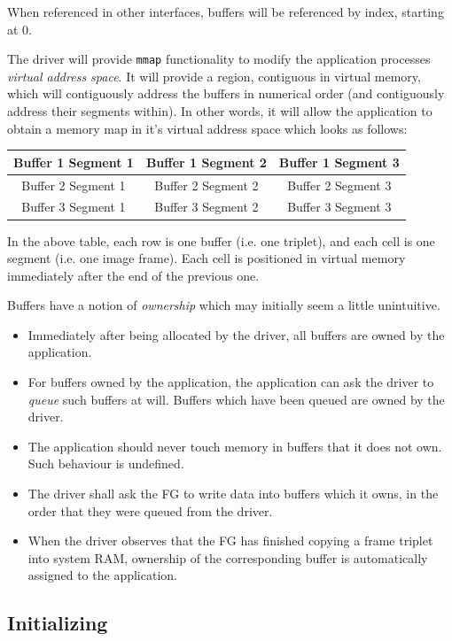 \documentclass[12pt]{article}
\begin{document}
When referenced in other interfaces, buffers will be referenced by index, starting at 0.

The driver will provide \texttt{mmap} functionality to modify the application processes \textit{virtual address space}. It will provide a region, contiguous in virtual memory, which will contiguously address the buffers in numerical order (and contiguously address their segments within). In other words, it will allow the application to obtain a memory map in it's virtual address space which looks as follows:

\begin{tabular}{|c|c|c|}\hline
Buffer 1 Segment 1 & Buffer 1 Segment 2 & Buffer 1 Segment 3 \\ \hline
Buffer 2 Segment 1 & Buffer 2 Segment 2 & Buffer 2 Segment 3 \\ \hline
Buffer 3 Segment 1 & Buffer 3 Segment 2 & Buffer 3 Segment 3 \\ \hline
\end{tabular}

In the above table, each row is one buffer (i.e. one triplet), and each cell is one segment (i.e. one image frame). Each cell is positioned in virtual memory immediately after the end of the previous one.

Buffers have a notion of \textit{ownership} which may initially seem a little unintuitive.
\begin{itemize}
\item Immediately after being allocated by the driver, all buffers are owned by the application.
\item For buffers owned by the application, the application can ask the driver to \textit{queue} such buffers at will. Buffers which have been queued are owned by the driver.
\item The application should never touch memory in buffers that it does not own. Such behaviour is undefined.
\item The driver shall ask the FG to write data into buffers which it owns, in the order that they were queued from the driver.
\item When the driver observes that the FG has finished copying a frame triplet into system RAM, ownership of the corresponding buffer is automatically assigned to the application.
\end{itemize}

\subsection{Initializing}
\end{document}
